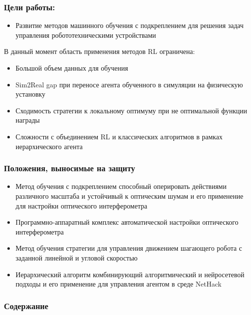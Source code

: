 \begin{frame}
    \setcounter{framenumber}{1}
    \maketitle
\end{frame}

\begin{frame}
    \frametitle{Цели работы:}
    \begin{itemize}
        \item Развитие методов машинного обучения с подкреплением для решения задач управления робототехническими устройствами
    \end{itemize}

    \vspace{20pt}
    В данный момент область применения методов RL ограничена:
    \begin{itemize}
        \item Большой объем данных для обучения
        \item Sim2Real gap при переносе агента обученного в симуляции на физическую установку
        \item Сходимость стратегии к локальному оптимуму при не оптимальной функции награды
       \item Сложности с объединением RL и классических алгоритмов в рамках иерархического агента 
    \end{itemize}
\end{frame}

\begin{frame}
    \frametitle{Положения, выносимые на защиту}
    \begin{itemize}
        \item Метод обучения с подкреплением способный оперировать действиями различного масштаба и устойчивый к оптическим шумам и его применение для настройки оптического интерферометра
        \item Программно-аппаратный комплекс автоматической настройки оптического интерферометра
        \item Метод обучения стратегии для управления движением шагающего робота с заданной линейной и угловой скоростью
        \item Иерархический алгоритм комбинирующий алгоритмический и нейросетевой подходы и его применение для управления агентом в среде NetHack
    \end{itemize}
\end{frame}

\begin{frame}
    \frametitle{Содержание}
    \tableofcontents
\end{frame}
